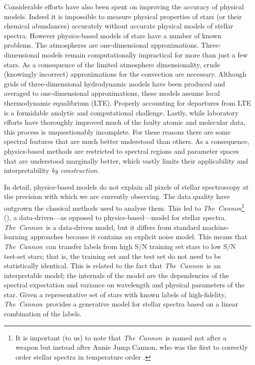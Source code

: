 \documentclass[12pt,preprint]{aastex}
\newcommand{\project}[1]{\textsl{#1}}
\newcommand{\TheCannon}{\project{The~Cannon}}
\begin{document}
Considerable efforts have also been spent on improving the accuracy of physical
models.  Indeed it is impossible to measure physical properties of stars (or 
their chemical abundances) accurately without accurate physical models of 
stellar spectra.  However physics-based models of stars have a number of known
problems.  The atmospheres are one-dimensional approximations.  
Three-dimensional models remain computationally impractical for more than just a
few stars.  As a consequence of the limited atmosphere dimensionality, crude 
(knowingly incorrect) approximations for the convection are 
necessary.  Although grids of three-dimensional hydrodynamic models have been 
produced and averaged to one-dimensional approximations, these models assume 
local thermodynamic equalibrium (LTE).  Properly accounting for departures from 
LTE is a formidable analytic and computational challenge.  Lastly, while 
laboratory efforts have thoroughly improved much of the faulty atomic and 
molecular data, this process is unquestionably incomplete.  For these reasons 
there are some spectral features that are much better understood than others.  
As a consequence, physics-based methods are restricted to spectral regions and
parameter spaces that are understood marginally better, which vastly limits 
their applicability and interpretability \emph{by construction}.


In detail, physics-based models do not explain all pixels of stellar 
spectroscopy at the precision with which we are currently observing.  The data
quality have outgrown the classical methods used to analyse them.  This led to 
\TheCannon\footnote{It is important (to us) to note that \TheCannon\ is named 
not after a weapon but instead after Annie Jump Cannon, who was the first to 
correctly order stellar spectra in temperature order \citep[and who did
so by looking at the data, and without any use of physics-based models, see][]
{Cannon_1912}.} (\citealt{tc}), a data-driven---as opposed to 
physics-based---model for stellar spectra.  \TheCannon\ is a data-driven model, 
but it differs from standard machine-learning approaches because it contains an 
explicit noise model.  This means that \TheCannon\ can transfer labels from high
S/N training set stars to low S/N test-set stars; that is, the training set and
the test set do not need to be statistically identical.  This is related to the
fact that \TheCannon\ is an interpretable model; the internals of the model are 
the dependencies of the spectral expectation and variance on wavelength and 
physical parameters of the star.  Given a representative set of stars with known
labels of high-fidelity, \TheCannon\ provides a generative model for stellar 
spectra based on a linear combination of the labels.  
\end{document}
